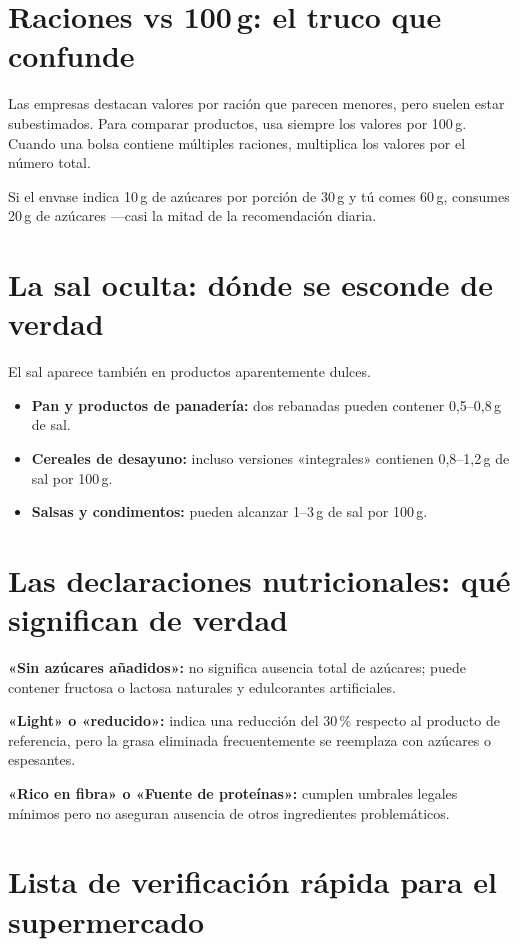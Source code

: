 \documentclass[a5paper,12pt,oneside,openany]{book}
\newcommand{\boxamarillo}[2]{%
  \begin{tcolorbox}[cajabase,
    colback=amarillo!12!white, colframe=amarillo!80!black, title={#1}]
  #2\end{tcolorbox}}
\begin{document}
\section{Raciones vs 100\,g: el truco que confunde}

Las empresas destacan valores por ración que parecen menores, pero suelen estar
subestimados. Para comparar productos, usa siempre los valores por 100\,g. Cuando
una bolsa contiene múltiples raciones, multiplica los valores por el número total.

\boxamarillo{Ejemplo}{Si el envase indica 10\,g de azúcares por porción de 30\,g
y tú comes 60\,g, consumes 20\,g de azúcares ---casi la mitad de la
recomendación diaria.}

\section{La sal oculta: dónde se esconde de verdad}

El sal aparece también en productos aparentemente dulces.

\begin{itemize}
  \item \textbf{Pan y productos de panadería:} dos rebanadas pueden contener
    0,5--0,8\,g de sal.
  \item \textbf{Cereales de desayuno:} incluso versiones «integrales» contienen
    0,8--1,2\,g de sal por 100\,g.
  \item \textbf{Salsas y condimentos:} pueden alcanzar 1--3\,g de sal por 100\,g.
\end{itemize}

\section{Las declaraciones nutricionales: qué significan de verdad}

\textbf{«Sin azúcares añadidos»:} no significa ausencia total de azúcares;
puede contener fructosa o lactosa naturales y edulcorantes artificiales.

\textbf{«Light» o «reducido»:} indica una reducción del 30\,\% respecto al
producto de referencia, pero la grasa eliminada frecuentemente se reemplaza
con azúcares o espesantes.

\textbf{«Rico en fibra» o «Fuente de proteínas»:} cumplen umbrales legales
mínimos pero no aseguran ausencia de otros ingredientes problemáticos.

\section{Lista de verificación rápida para el supermercado}
\end{document}

